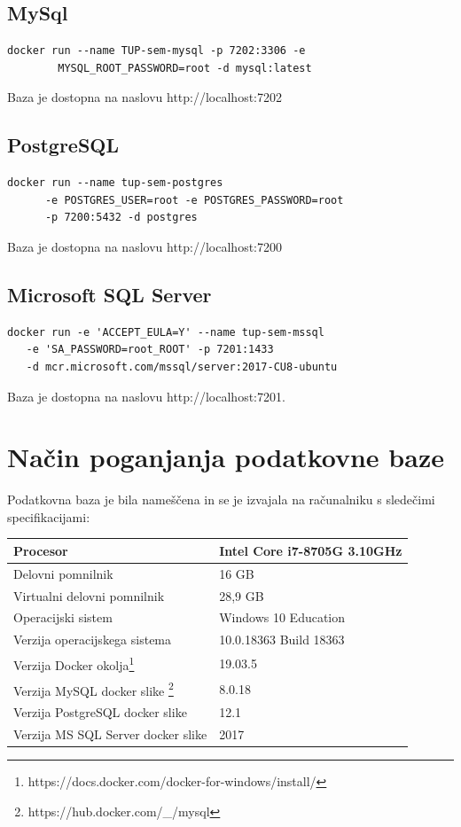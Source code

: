 \documentclass[a4paper,11pt]{report}
\begin{document}
\subsection{MySql}
\begin{lstlisting}
docker run --name TUP-sem-mysql -p 7202:3306 -e 
        MYSQL_ROOT_PASSWORD=root -d mysql:latest
\end{lstlisting}

Baza je dostopna na naslovu http://localhost:7202

\subsection{PostgreSQL}
\begin{lstlisting}
docker run --name tup-sem-postgres 
      -e POSTGRES_USER=root -e POSTGRES_PASSWORD=root 
      -p 7200:5432 -d postgres
\end{lstlisting}
   
Baza je dostopna na naslovu http://localhost:7200

\subsection{Microsoft SQL Server}
\begin{lstlisting}
docker run -e 'ACCEPT_EULA=Y' --name tup-sem-mssql 
   -e 'SA_PASSWORD=root_ROOT' -p 7201:1433 
   -d mcr.microsoft.com/mssql/server:2017-CU8-ubuntu
\end{lstlisting}
   
Baza je dostopna na naslovu http://localhost:7201.



\section{Način poganjanja podatkovne baze}
Podatkovna baza je bila nameščena in se je izvajala na računalniku s sledečimi specifikacijami:

\begin{center}
    \begin{tabular}{||l|l||}
        \hline
        Procesor & Intel Core i7-8705G 3.10GHz\\
        \hline
        Delovni pomnilnik & 16 GB\\
        \hline
        Virtualni delovni pomnilnik & 28,9 GB\\
        \hline
        Operacijski sistem & Windows 10 Education\\
        \hline
        Verzija operacijskega sistema & 10.0.18363 Build 18363\\
        \hline
        Verzija Docker okolja\footnote{https://docs.docker.com/docker-for-windows/install/} & 19.03.5\\
        \hline
        Verzija MySQL docker slike \footnote{https://hub.docker.com/\_/mysql} & 8.0.18 \\
        \hline
        Verzija PostgreSQL docker slike & 12.1\\
        \hline
        Verzija MS SQL Server docker slike & 2017\\
        \hline
    \end{tabular}
\end{center}
\end{document}
